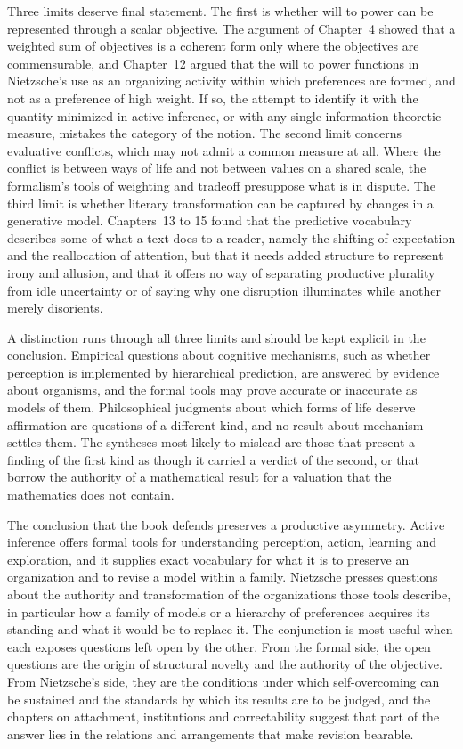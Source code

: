 Three limits deserve final statement. The first is whether will to power can be represented through a scalar objective. The argument of Chapter~4 showed that a weighted sum of objectives is a coherent form only where the objectives are commensurable, and Chapter~12 argued that the will to power functions in Nietzsche's use as an organizing activity within which preferences are formed, and not as a preference of high weight. If so, the attempt to identify it with the quantity minimized in active inference, or with any single information-theoretic measure, mistakes the category of the notion. The second limit concerns evaluative conflicts, which may not admit a common measure at all. Where the conflict is between ways of life and not between values on a shared scale, the formalism's tools of weighting and tradeoff presuppose what is in dispute. The third limit is whether literary transformation can be captured by changes in a generative model. Chapters~13 to 15 found that the predictive vocabulary describes some of what a text does to a reader, namely the shifting of expectation and the reallocation of attention, but that it needs added structure to represent irony and allusion, and that it offers no way of separating productive plurality from idle uncertainty or of saying why one disruption illuminates while another merely disorients.

A distinction runs through all three limits and should be kept explicit in the conclusion. Empirical questions about cognitive mechanisms, such as whether perception is implemented by hierarchical prediction, are answered by evidence about organisms, and the formal tools may prove accurate or inaccurate as models of them. Philosophical judgments about which forms of life deserve affirmation are questions of a different kind, and no result about mechanism settles them. The syntheses most likely to mislead are those that present a finding of the first kind as though it carried a verdict of the second, or that borrow the authority of a mathematical result for a valuation that the mathematics does not contain.

The conclusion that the book defends preserves a productive asymmetry. Active inference offers formal tools for understanding perception, action, learning and exploration, and it supplies exact vocabulary for what it is to preserve an organization and to revise a model within a family. Nietzsche presses questions about the authority and transformation of the organizations those tools describe, in particular how a family of models or a hierarchy of preferences acquires its standing and what it would be to replace it. The conjunction is most useful when each exposes questions left open by the other. From the formal side, the open questions are the origin of structural novelty and the authority of the objective. From Nietzsche's side, they are the conditions under which self-overcoming can be sustained and the standards by which its results are to be judged, and the chapters on attachment, institutions and correctability suggest that part of the answer lies in the relations and arrangements that make revision bearable.

